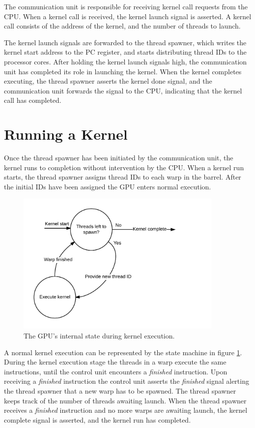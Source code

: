 \documentclass[../main/report.tex]{subfiles}
\begin{document}
The communication unit is responsible for receiving kernel call requests from the CPU.
When a kernel call is received, the kernel launch signal is asserted.
A kernel call consists of the address of the kernel, and the number of threads to launch.

The kernel launch signals are forwarded to the thread spawner, which writes the kernel start address to the PC register, and starts distributing thread IDs to the processor cores. 
After holding the kernel launch signals high, the communication unit has completed its role in launching the kernel.
When the kernel completes executing, the thread spawner asserts the kernel done signal, and the communication unit forwards the signal to the CPU, indicating that the kernel call has completed.


\section{Running a Kernel}
Once the thread spawner has been initiated by the communication unit, the kernel runs to completion without intervention by the CPU. 
When a kernel run starts, the thread spawner assigns thread IDs to each warp in the barrel.
After the initial IDs have been assigned the GPU enters normal execution.
\begin{figure}[H]
	\centering
	\includegraphics[width=0.9\textwidth]{../gpu/diagrams/kernel_run_state_machine.png}
	\caption{The GPU's internal state during kernel execution.}
	\label{fig:kernel_run_state_machine}
\end{figure}
A normal kernel execution can be represented by the state machine in figure \ref{fig:kernel_run_state_machine}.
During the kernel execution stage the threads in a warp execute the same instructions, until the control unit encounters a \emph{finished} instruction.
Upon receiving a \emph{finished} instruction the control unit asserts the \emph{finished} signal alerting the thread spawner that a new warp has to be spawned.
The thread spawner keeps track of the number of threads awaiting launch.
When the thread spawner receives a \emph{finished} instruction and no more warps are awaiting launch, the kernel complete signal is asserted, and the kernel run has completed.
\end{document}
